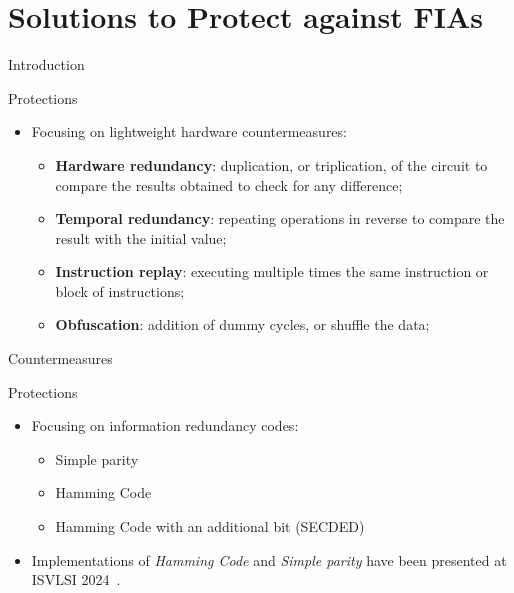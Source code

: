 \section{Solutions to Protect against FIAs}

\begin{frame}{Introduction}
    \begin{block}{Protections}
        \begin{itemize}
            \item Focusing on lightweight hardware countermeasures:
            \begin{itemize}
                \item \textbf{Hardware redundancy}: duplication, or triplication, of the circuit to compare the results obtained to check for any difference;
                \item \textbf{Temporal redundancy}: repeating operations in reverse to compare the result with the initial value;
                \item \textbf{Instruction replay}: executing multiple times the same instruction or block of instructions;
                \item \textbf{Obfuscation}: addition of dummy cycles, or shuffle the data;
            \end{itemize}
        \end{itemize}
    \end{block}
\end{frame}

\begin{frame}{Countermeasures}
    \begin{block}{Protections}
        \begin{itemize}
            \item Focusing on information redundancy codes:
            \begin{itemize}
                \item Simple parity
                \item Hamming Code
                \item Hamming Code with an additional bit (SECDED)
            \end{itemize}
            \item Implementations of \textit{Hamming Code} and \textit{Simple parity} have been presented at ISVLSI 2024~\cite{PRLG-24-isvlsi}.
        \end{itemize}
    \end{block}
\end{frame}

